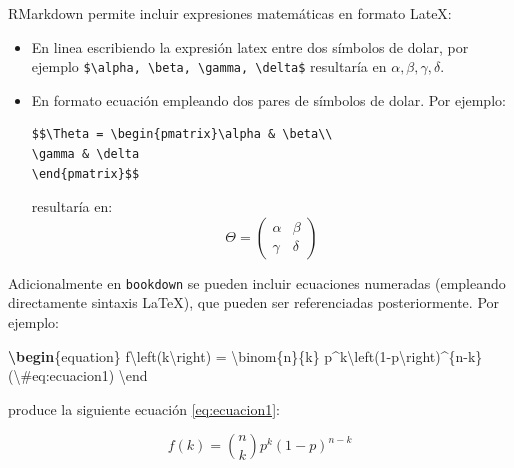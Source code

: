 \documentclass[]{book}
\newenvironment{Shaded}{\begin{snugshade}}{\end{snugshade}}
\newcommand{\KeywordTok}[1]{\textcolor[rgb]{0.13,0.29,0.53}{\textbf{#1}}}
\newcommand{\SpecialCharTok}[1]{\textcolor[rgb]{0.00,0.00,0.00}{#1}}
\newcommand{\SpecialStringTok}[1]{\textcolor[rgb]{0.31,0.60,0.02}{#1}}
\newcommand{\ExtensionTok}[1]{#1}
\newcommand{\NormalTok}[1]{#1}
\theoremstyle{definition}
\theoremstyle{definition}
\theoremstyle{definition}
\theoremstyle{remark}
\begin{document}
RMarkdown permite incluir expresiones matemáticas en formato LateX:

\begin{itemize}
\item
  En linea escribiendo la expresión latex entre dos símbolos de dolar,
  por ejemplo
  \texttt{\$\textbackslash{}alpha,\ \textbackslash{}beta,\ \textbackslash{}gamma,\ \textbackslash{}delta\$}
  resultaría en \(\alpha, \beta, \gamma, \delta\).
\item
  En formato ecuación empleando dos pares de símbolos de dolar. Por
  ejemplo:

\begin{verbatim}
$$\Theta = \begin{pmatrix}\alpha & \beta\\
\gamma & \delta
\end{pmatrix}$$
\end{verbatim}

  resultaría en: \[\Theta = \begin{pmatrix}\alpha & \beta\\
  \gamma & \delta
  \end{pmatrix}\]
\end{itemize}

Adicionalmente en \texttt{bookdown} se pueden incluir ecuaciones
numeradas (empleando directamente sintaxis LaTeX), que pueden ser
referenciadas posteriormente. Por ejemplo:

\begin{Shaded}
\begin{Highlighting}[]
\KeywordTok{\textbackslash{}begin}\NormalTok{\{}\ExtensionTok{equation}\NormalTok{\}}\SpecialStringTok{ }
\SpecialStringTok{  f}\SpecialCharTok{\textbackslash{}left}\SpecialStringTok{(k}\SpecialCharTok{\textbackslash{}right}\SpecialStringTok{) = }\SpecialCharTok{\textbackslash{}binom}\SpecialStringTok{\{n\}\{k\} p^k}\SpecialCharTok{\textbackslash{}left}\SpecialStringTok{(1-p}\SpecialCharTok{\textbackslash{}right}\SpecialStringTok{)^\{n-k\}}
\SpecialStringTok{  (}\SpecialCharTok{\textbackslash{}#}\SpecialStringTok{eq:ecuacion1)}
\SpecialCharTok{\textbackslash{}end}
\end{Highlighting}
\end{Shaded}

produce la siguiente ecuación \eqref{eq:ecuacion1}:

\begin{equation}
f\left(k\right)=\binom{n}{k}p^k\left(1-p\right)^{n-k} \label{eq:ecuacion1}
\end{equation}
\end{document}
